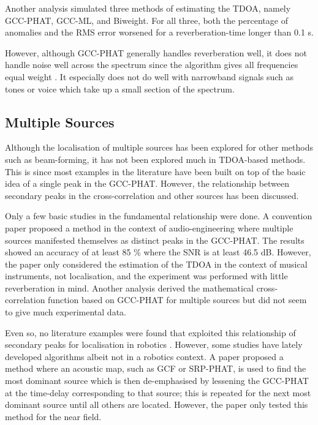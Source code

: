 \documentclass[notitlepage]{report}
\begin{document}
Another analysis \cite{brandstein_robust_1997} simulated three methods of estimating the TDOA, namely GCC-PHAT, GCC-ML, and Biweight. For all three, both the percentage of anomalies and the RMS error worsened for a reverberation-time longer than 0.1 \si{s}.

However, although GCC-PHAT generally handles reverberation well, it does not handle noise well across the spectrum since the algorithm gives all frequencies equal weight \cite{valin_robust_2003}. It especially does not do well with narrowband signals such as tones or voice which take up a small section of the spectrum.


\subsection{Multiple Sources}

Although the localisation of multiple sources has been explored for other methods such as beam-forming, it has not been explored much in TDOA-based methods. This is since most examples in the literature have been built on top of the basic idea of a single peak in the GCC-PHAT. However, the relationship between secondary peaks in the cross-correlation and other sources has been discussed.

Only a few basic studies in the fundamental relationship were done. A convention paper \cite{clifford_calculating_2010} proposed a method in the context of audio-engineering where multiple sources manifested themselves as distinct peaks in the GCC-PHAT. The results showed an accuracy of at least 85 \% where the SNR is at least 46.5 \si{dB}. However, the paper only considered the estimation of the TDOA in the context of musical instruments, not localisation, and the experiment was performed with little reverberation in mind. Another analysis \cite{kwon_analysis_2010} derived the mathematical cross-correlation function based on GCC-PHAT for multiple sources but did not seem to give much experimental data. 

Even so, no literature examples were found that exploited this relationship of secondary peaks for localisation in robotics \cite{rascon_localization_2017}. However, some studies have lately developed algorithms albeit not in a robotics context. A paper \cite{brutti_multiple_2010} proposed a method where an acoustic map, such as GCF or SRP-PHAT, is used to find the most dominant source which is then de-emphasised by lessening the GCC-PHAT at the time-delay corresponding to that source; this is repeated for the next most dominant source until all others are located. However, the paper only tested this method for the near field.
\end{document}
